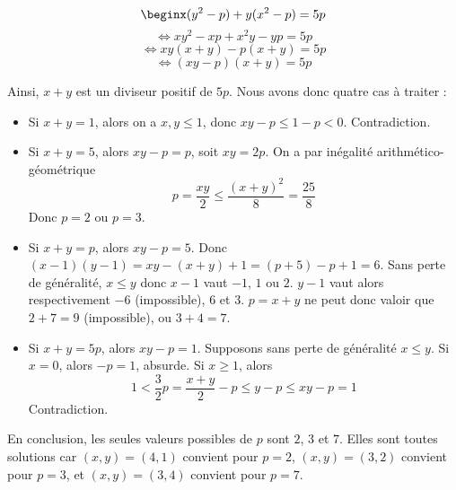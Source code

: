 $$\beginx(y^2-p)+y(x^2-p)=5p$$
$$\iff xy^2-xp+x^2y-yp = 5p$$
$$\iff xy(x + y)-p(x + y)=5p$$
$$\iff (xy - p)(x + y)=5p$$

Ainsi, $x + y$ est un diviseur positif de $5p$. Nous avons donc quatre cas à traiter :
\begin{itemize}
\item Si $x + y = 1$, alors on a $x, y \le 1$, donc $xy - p \le 1 - p < 0$. Contradiction.
\item Si $x + y = 5$, alors $xy - p = p$, soit $xy = 2p$. On a par inégalité arithmético-géométrique
$$p = \frac{xy}2 \le \frac{(x + y)^2}8 = \frac{25}8 $$
Donc $p = 2$ ou $p = 3$.
\item Si $x + y = p$, alors $xy - p = 5$. Donc $(x - 1)(y - 1) = xy - (x + y) + 1 = (p + 5) - p + 1 = 6$. Sans perte de généralité, $x \le y$ donc $x - 1$ vaut $-1$, $1$ ou $2$. $y - 1$ vaut alors respectivement $-6$ (impossible), $6$ et $3$. $p = x + y$ ne peut donc valoir que $2 + 7 = 9$ (impossible), ou $3 +  4 = 7$.
\item Si $x + y = 5p$, alors $xy - p = 1$. Supposons sans perte de généralité $x \le y$. Si $x = 0$, alors $-p = 1$, absurde. Si $x \ge 1$, alors
$$1 < \frac 32 p = \frac{x + y}2 - p \le  y - p \le xy - p = 1$$
Contradiction.
\end{itemize}

En conclusion, les seules valeurs possibles de $p$ sont $2$, $3$ et $7$. Elles sont toutes solutions car $(x, y) = (4, 1)$ convient pour $p = 2$, $(x, y) = (3, 2)$ convient pour $p = 3$, et $(x, y) = (3, 4)$ convient pour $p = 7$.